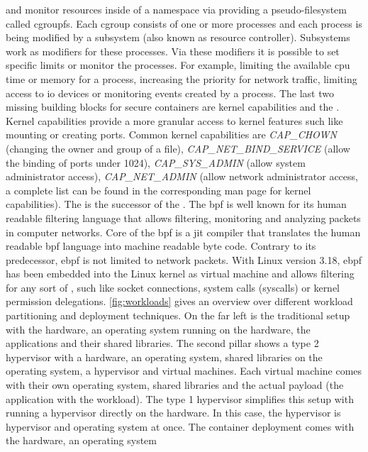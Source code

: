 \documentclass[titlepage]{report}
\begin{document}
and monitor resources inside of a namespace via providing a pseudo-filesystem called cgroupfs\cite{mancgroups}. Each \gls{cgroup} consists
of one or more processes and each process is being modified by a subsystem (also known as resource controller). Subsystems work as modifiers
for these processes. Via these modifiers it is possible to set specific limits or monitor the processes. For example, limiting the available
\gls{cpu} time or memory for a process, increasing the priority for network traffic, limiting access to \gls{io} devices or
monitoring events created by a process\cite{mancgroups}. The last two missing building blocks for secure containers are kernel capabilities and the .
Kernel capabilities provide a more granular access to kernel features such like mounting or creating ports\cite{dockersecurity}.
Common kernel capabilities are \emph{CAP\_CHOWN} (changing the owner and group of a file), \emph{CAP\_NET\_BIND\_SERVICE} (allow the binding of ports under 1024), 
\emph{CAP\_SYS\_ADMIN} (allow system administrator access), \emph{CAP\_NET\_ADMIN} (allow network administrator access, a complete list can be found
in the corresponding man page for kernel capabilities\cite{mancapabilities}). The  is the successor of the . The \gls{bpf} is 
well known for its human readable filtering language that allows filtering, monitoring and analyzing packets in computer networks. Core of the \gls{bpf}
is a \gls{jit} compiler that translates the human readable \gls{bpf} language into machine readable byte code. Contrary to its predecessor, \gls{ebpf} is not limited
to network packets. With Linux version 3.18, \gls{ebpf} has been embedded into the Linux kernel as virtual machine and allows filtering for any sort of ,
such like socket connections, system calls (syscalls) or kernel permission delegations. \autoref{fig:workloads} gives an overview over different workload partitioning and
deployment techniques. On the far left is the traditional setup with the hardware, an operating system running on the hardware, the applications and their shared libraries.
The second pillar shows a type 2 hypervisor with a hardware, an operating system, shared libraries on the operating system, a hypervisor and virtual machines. Each virtual machine
comes with their own operating system, shared libraries and the actual payload (the application with the workload). The type 1 hypervisor simplifies this setup with running
a hypervisor directly on the hardware. In this case, the hypervisor is hypervisor and operating system at once. The container deployment comes with the hardware, an operating system 
\end{document}
